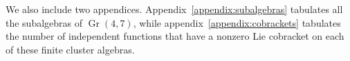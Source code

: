 \documentclass[12pt]{article}
\DeclareMathOperator{\Gr}{Gr}
\def\flag{{\color{red} $\bigstar$}}
\begin{document}
We also include two appendices. Appendix~\ref{appendix:subalgebras} tabulates all the subalgebras of $\Gr(4,7)$, while appendix~\ref{appendix:cobrackets} tabulates the number of independent functions that have a nonzero Lie cobracket on each of these finite cluster algebras.




\end{document}
